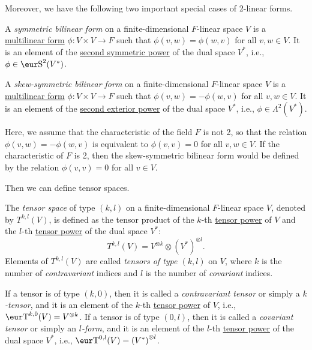 Moreover, we have the following two important special cases of 2-linear forms.
\begin{definition}\label{def:symmetric_bilinear_form}
	A \emph{symmetric bilinear form} on a finite-dimensional $F$-linear space $V$ is a \hyperref[def:multilinear_form]{multilinear form} $\phi \colon V \times V \to F$ such that $\phi(v, w) = \phi(w, v)$ for all $v, w \in V$. It is an element of the \hyperref[def:symmetric_power]{second symmetric power} of the dual space $V^*$, i.e., $\phi \in \Sy^2(V^*)$.
\end{definition}
\begin{definition}\label{def:skew_symmetric_bilinear_form}
	A \emph{skew-symmetric bilinear form} on a finite-dimensional $F$-linear space $V$ is a \hyperref[def:multilinear_form]{multilinear form} $\phi \colon V \times V \to F$ such that $\phi(v, w) = -\phi(w, v)$ for all $v, w \in V$. It is an element of the \hyperref[def:exterior_power]{second exterior power} of the dual space $V^*$, i.e., $\phi \in \Lambda^2(V^*)$.
\end{definition}
\begin{remark}
	Here, we assume that the characteristic of the field $F$ is not 2, so that the relation $\phi(v, w) = -\phi(w, v)$ is equivalent to $\phi(v, v) = 0$ for all $v, w \in V$. If the characteristic of $F$ is 2, then the skew-symmetric bilinear form would be defined by the relation $\phi(v, v) = 0$ for all $v \in V$.
\end{remark}

Then we can define tensor spaces.
\begin{definition}\label{def:tensor_space}
	The \emph{tensor space} of type $(k, l)$ on a finite-dimensional $F$-linear space $V$, denoted by $T^{k, l}(V)$, is defined as the tensor product of the $k$-th \hyperref[def:tensor_power]{tensor power} of $V$ and the $l$-th \hyperref[def:tensor_power]{tensor power} of the dual space $V^*$:
	\[
		T^{k, l}(V) = V^{\otimes k} \otimes {(V^*)}^{\otimes l}.
	\]
	Elements of $T^{k, l}(V)$ are called \emph{tensors of type $(k, l)$} on $V$, where $k$ is the number of \emph{contravariant} indices and $l$ is the number of \emph{covariant} indices.
\end{definition}

If a tensor is of type $(k, 0)$, then it is called a \emph{contravariant tensor} or simply a \emph{$k$-tensor}, and it is an element of the $k$-th \hyperref[def:tensor_power]{tensor power} of $V$, i.e., $\Ten^{k, 0}(V) = V^{\otimes k}$. If a tensor is of type $(0, l)$, then it is called a \emph{covariant tensor} or simply an \emph{$l$-form}, and it is an element of the $l$-th \hyperref[def:tensor_power]{tensor power} of the dual space $V^*$, i.e., $\Ten^{0, l}(V) = {(V^*)}^{\otimes l}$.

